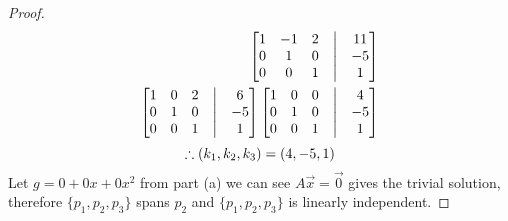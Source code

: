 \documentclass[12pt]{article}
\begin{document}
\begin{enumerate}
\begin{enumerate}
\begin{proof}
\begin{align*}
                                            \begin{bmatrix}
                                                    1 & -1 & 2 & \bigm| & 11 \\
                                                    0 & 1  & 0 & \bigm| & -5 \\
                                                    0 & 0  & 1 & \bigm| & 1  \\
                                            \end{bmatrix}
                                             &
                                            \\
                                            \begin{bmatrix}
                                                    1 & 0 & 2 & \bigm| & 6  \\
                                                    0 & 1 & 0 & \bigm| & -5 \\
                                                    0 & 0 & 1 & \bigm| & 1  \\
                                            \end{bmatrix}
                                            \begin{bmatrix}
                                                    1 & 0 & 0 & \bigm| & 4  \\
                                                    0 & 1 & 0 & \bigm| & -5 \\
                                                    0 & 0 & 1 & \bigm| & 1  \\
                                            \end{bmatrix}
                                             &
                                    \end{align*}
                                    \begin{equation*}
                                            \therefore (k_{1}, k_{2}, k_{3}) = (4, -5, 1) \\
                                    \end{equation*}
                                    Let $g = 0 + 0x + 0x^2$ from part (a) we can see $A\vec{x} = \vec{0}$ gives the trivial solution,
                                    therefore $\{p_1,p_2,p_3\}$ spans $p_{2}$ and $\{p_1,p_2,p_3\}$ is linearly independent.
                            \end{proof}
              \end{enumerate}
\end{enumerate}
\end{document}

